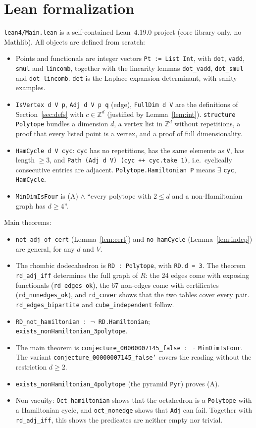 \documentclass[11pt]{article}
\theoremstyle{definition}
\theoremstyle{remark}
\begin{document}
\section{Lean formalization}
\texttt{lean4/Main.lean} is a self-contained Lean~4.19.0 project (core library
only, no Mathlib). All objects are defined from scratch:
\begin{itemize}
\item Points and functionals are integer vectors \texttt{Pt := List Int}, with
\texttt{dot}, \texttt{vadd}, \texttt{smul} and \texttt{lincomb}, together with the
linearity lemmas \texttt{dot\_vadd}, \texttt{dot\_smul} and \texttt{dot\_lincomb}.
\texttt{det} is the Laplace-expansion determinant, with sanity examples.
\item \texttt{IsVertex d V p}, \texttt{Adj d V p q} (edge), \texttt{FullDim d V}
are the definitions of Section~\ref{sec:defs} with $c\in\mathbb{Z}^d$
(justified by Lemma~\ref{lem:int}). \texttt{structure Polytope} bundles a dimension
$d$, a vertex list in $\mathbb{Z}^d$ without repetitions, a proof that every listed
point is a vertex, and a proof of full dimensionality.
\item \texttt{HamCycle d V cyc}: \texttt{cyc} has no repetitions, has the same
elements as \texttt{V}, has length $\ge3$, and \texttt{Path (Adj d V) (cyc ++
cyc.take 1)}, i.e.\ cyclically consecutive entries are adjacent.
\texttt{Polytope.Hamiltonian P} means $\exists$ \texttt{cyc}, \texttt{HamCycle}.
\item \texttt{MinDimIsFour} is (A) $\wedge$ ``every polytope with $2\le d$ and a
non-Hamiltonian graph has $d\ge4$''.
\end{itemize}
Main theorems:
\begin{itemize}
\item \texttt{not\_adj\_of\_cert} (Lemma~\ref{lem:cert}) and \texttt{no\_hamCycle}
(Lemma~\ref{lem:indep}) are general, for any $d$ and $V$.
\item The rhombic dodecahedron is \texttt{RD : Polytope}, with \texttt{RD.d = 3}.
The theorem \texttt{rd\_adj\_iff} determines the full graph of $R$: the 24 edges come with exposing functionals
(\texttt{rd\_edges\_ok}), the 67 non-edges come with certificates
(\texttt{rd\_nonedges\_ok}), and \texttt{rd\_cover} shows that the two tables
cover every pair. \texttt{rd\_edges\_bipartite} and \texttt{cube\_independent} follow.
\item \texttt{RD\_not\_hamiltonian : $\neg$ RD.Hamiltonian};
\texttt{exists\_nonHamiltonian\_3polytope}.
\item The main theorem is \texttt{conjecture\_00000007145\_false :}
\texttt{$\neg$ MinDimIsFour}. The variant \texttt{conjecture\_00000007145\_false'}
covers the reading without the restriction $d\ge2$.
\item \texttt{exists\_nonHamiltonian\_4polytope} (the pyramid \texttt{Pyr}) proves (A).
\item Non-vacuity: \texttt{Oct\_hamiltonian} shows that the octahedron is a
\texttt{Polytope} with a Hamiltonian cycle, and \texttt{oct\_nonedge} shows that
\texttt{Adj} can fail. Together with \texttt{rd\_adj\_iff}, this shows the
predicates are neither empty nor trivial.
\end{itemize}
\end{document}
